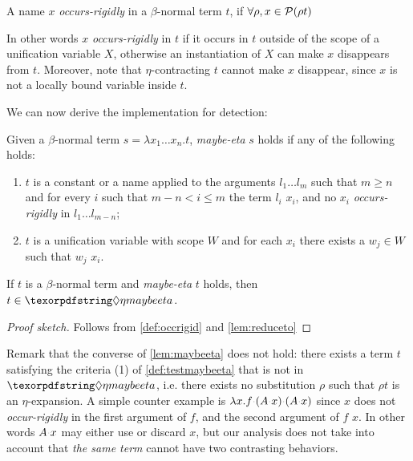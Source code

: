 \documentclass[sigconf,natbib=false,review]{acmart}
\newcommand{\appsep}{\ensuremath{\textcolor{lightgray}{\cdot}}}
\newcommand{\llambda}{\ensuremath{\mathcal{L}}\xspace}
\begin{document}

\newcommand{\occursrigid}{\emph{occurs-rigidly}\xspace}
\newcommand{\occurrigid}{\emph{occur-rigidly}\xspace}
\begin{definition}[\occursrigid]\label{def:occrigid}
  A name $x$ \occursrigid{} in a $\beta$-normal term $t$, if $\forall \rho, x \in
  \mathcal{P}(\rho t)$
\end{definition}

In other words $x$ \occursrigid in $t$ if it occurs in $t$
outside of the scope of a unification variable $X$, otherwise an instantiation
of $X$ can make $x$ disappears from $t$.
Moreover, note that $\eta$-contracting $t$ cannot make $x$ disappear, since
$x$ is not a locally bound variable inside $t$.

We can now derive the implementation for \maybeeta detection:

\newcommand{\testmaybeeta}{\emph{maybe-eta}\xspace}
\begin{definition}[\testmaybeeta]\label{def:testmaybeeta}
  Given a $\beta$-normal term
  $s = \lambda x_1 \ldots x_n.t$, \testmaybeeta{} $s$ holds if any
  of the following holds:
  \begin{enumerate}
    \item $t$ is a constant or a name applied to the arguments
      $l_1 \ldots l_m$ such that 
      $m \geq n$ and for every $i$ such that $m - n < i \leq m$
      the term  $l_i$
      \reduceto{} $x_i$, and
      no $x_i$ \occursrigid{} in $l_1 \ldots l_{m-n}$;
    \item $t$ is a
      unification variable with scope $W$ and
      for each $x_i$ there exists a $w_j \in W$ such that $w_j$
      \reduceto{} $x_i$.
  \end{enumerate}
\end{definition}
\begin{lemma}\label{lem:maybeeta}
  If $t$ is a $\beta$-normal term and \testmaybeeta{} $t$ holds,
  then $t \in \maybeeta$.
\end{lemma}
\begin{proof}[Proof sketch]
Follows from \cref{def:occrigid} and \cref{lem:reduceto}
\end{proof}

\noindent
Remark that the converse of \cref{lem:maybeeta} does not hold: 
there exists a term $t$ satisfying the criteria (1) of
\cref{def:testmaybeeta} that is not in $\maybeeta$, i.e.
there exists no substitution $\rho$ such that $\rho t$ is an
$\eta$-expansion. A simple counter example is
$\lambda x. f \appsep (A \appsep x) \appsep (A \appsep x)$
since $x$ does not \occurrigid{} in the first argument
of $f$,
and the second argument of $f$ \reduceto{} $x$.
In other words $A \appsep x$
may either use or discard $x$, but our analysis does not
take into account that \emph{the same
term} cannot have two contrasting behaviors.
\end{document}
